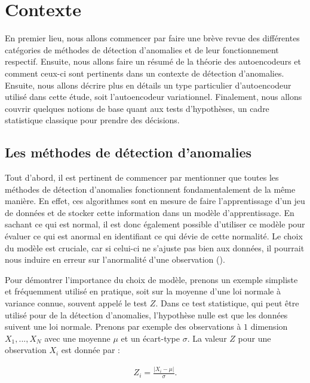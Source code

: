 \chapter{Contexte}     %
\label{chap:background}                   %

En premier lieu, nous allons commencer par faire une brève revue des différentes catégories  de méthodes de détection d'anomalies et de leur fonctionnement respectif. Ensuite, nous allons faire un résumé de la théorie des autoencodeurs et comment ceux-ci sont pertinents dans un contexte de détection d'anomalies. Ensuite, nous allons décrire plus en détails un type particulier d'autoencodeur utilisé dans cette étude, soit l'autoencodeur variationnel. Finalement, nous allons couvrir quelques notions de base quant aux tests d'hypothèses, un cadre statistique classique pour prendre des décisions.

\section{Les méthodes de détection d'anomalies}

Tout d'abord, il est pertinent de commencer par mentionner que toutes les méthodes de détection d'anomalies fonctionnent fondamentalement de la même manière. En effet, ces algorithmes sont en mesure de faire l'apprentissage d'un jeu de données et de stocker cette information dans un modèle d'apprentissage. En sachant ce qui est normal, il est donc également possible d'utiliser ce modèle pour évaluer ce qui est anormal en identifiant ce qui dévie de cette normalité. Le choix du modèle est cruciale, car si celui-ci ne s'ajuste pas bien aux données, il pourrait nous induire en erreur sur l'anormalité d'une observation (\cite{10.5555/3086742}). 

Pour démontrer l'importance du choix de modèle, prenons un exemple simpliste et fréquemment utilisé en pratique, soit sur la moyenne d'une loi normale à variance connue, souvent appelé le test $Z$. Dans ce test statistique, qui peut être utilisé pour de la détection d'anomalies, l'hypothèse nulle est que les données suivent une loi normale. Prenons par exemple des observations à $1$ dimension $X_1, ..., X_N$ avec une moyenne $\mu$ et un écart-type $\sigma$. La valeur $Z$ pour une observation $X_i$ est donnée par :

\begin{gather}
Z_i = \frac{|X_i-\mu|}{\sigma}.
\end{gather}

